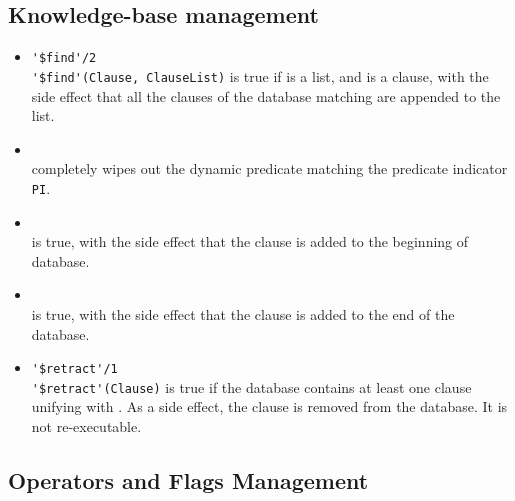 \subsection{Knowledge-base management}

\begin{itemize}
%
 \item \verb|'$find'/2|\\
 \noindent\verb|'$find'(Clause, ClauseList)| is true if 
 is a list, and  is a clause, with the side effect that
 all the clauses of the database matching  are
 appended to the list.\\
\noindent{}
%
\item {}\\
\noindent{} completely wipes out the dynamic
predicate matching the predicate indicator \texttt{PI}.\\
\noindent{}
%
\item {}\\
\noindent{} is true, with the side effect that
the clause  is added to the beginning of database.\\
\noindent{}
%
\item {}\\
\noindent{} is true, with the side effect that
the clause  is added to the end of the database.\\
\noindent{}
%
\item \verb|'$retract'/1|\\
\noindent\verb|'$retract'(Clause)| is true if the database contains
at least one clause unifying with . As a side effect, the
clause is removed from the database. It is not re-executable.\\
\noindent{}
%
\end{itemize}

\subsection{Operators and Flags Management}

